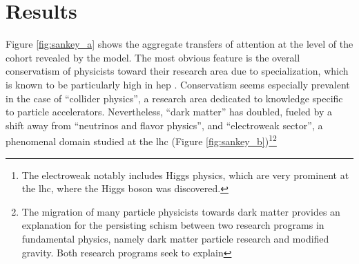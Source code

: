 \documentclass{article}
\begin{document}
 \section{\label{sec:results}Results}


Figure \ref{fig:sankey_a} shows the aggregate transfers of attention at the level of the cohort revealed by the model. %
The most obvious feature is the overall conservatism of physicists toward their research area due to specialization, which is known to be particularly high in \gls{hep} \citep{Aleta2019}. Conservatism seems especially prevalent in the case of ``collider physics'', a research area dedicated to knowledge specific to particle accelerators. Nevertheless, ``dark matter'' has doubled, fueled by a shift away from ``neutrinos and flavor physics'', and ``electroweak sector'', a phenomenal domain studied at the \gls{lhc} (Figure \ref{fig:sankey_b})\footnote{The electroweak notably includes Higgs physics, which are very prominent at the \gls{lhc}, where the Higgs boson was discovered.}\footnote{The migration of many particle physicists towards dark matter provides an explanation for the persisting schism between two research programs in fundamental physics, namely dark matter particle research and modified gravity. Both research programs seek to explain 
}
\end{document}
